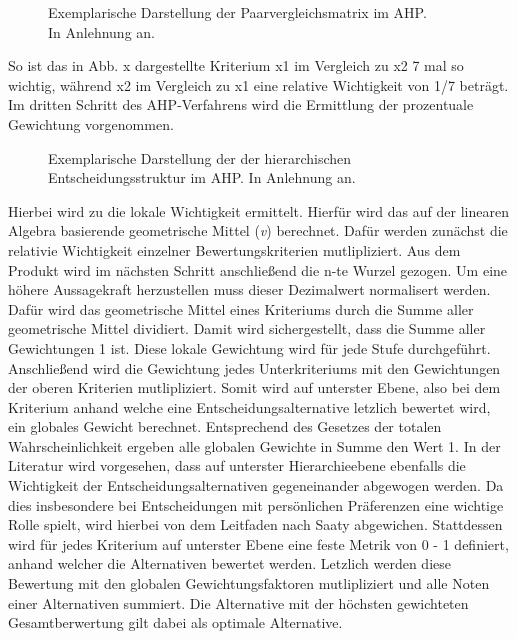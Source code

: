 \begin{center}
	\begin{figure}[H]
		\centering
		\caption[Exemplarische Darstellung der Paarvergleichsmatrix im AHP]{Exemplarische Darstellung der Paarvergleichsmatrix im AHP.\\ In Anlehnung an.}
		\label{fig:AHP_B}
	\end{figure}
\end{center}
\vspace*{-10mm}
So ist das in Abb. x dargestellte Kriterium x1 im Vergleich zu x2 7 mal so wichtig, während x2 im Vergleich zu x1 eine relative Wichtigkeit von 1/7 beträgt. Im dritten Schritt des AHP-Verfahrens wird die Ermittlung der prozentuale Gewichtung vorgenommen.
\begin{center}
	\begin{figure}[H]
		\centering
		\caption[Exemplarische Darstellung der der hierarchischen Entscheidungsstruktur im AHP]{Exemplarische Darstellung der der hierarchischen Entscheidungsstruktur im AHP. In Anlehnung an.}
		\label{fig:AHP_B}
	\end{figure}
\end{center}
\vspace*{-10mm}
Hierbei wird zu die lokale Wichtigkeit ermittelt. Hierfür wird das auf der linearen Algebra basierende geometrische Mittel (\textit{v}) berechnet. Dafür werden zunächst die relativie Wichtigkeit einzelner Bewertungskriterien mutlipliziert. Aus dem Produkt wird im nächsten Schritt anschließend die n-te Wurzel gezogen. Um eine höhere Aussagekraft herzustellen muss dieser Dezimalwert normalisert werden. Dafür wird das geometrische Mittel eines Kriteriums durch die Summe aller geometrische Mittel dividiert. Damit wird sichergestellt, dass die Summe aller Gewichtungen 1 ist. Diese lokale Gewichtung wird für jede Stufe durchgeführt. Anschließend wird die Gewichtung jedes Unterkriteriums mit den Gewichtungen der oberen Kriterien mutlipliziert. Somit wird auf unterster Ebene, also bei dem Kriterium anhand welche eine Entscheidungsalternative letzlich bewertet wird, ein globales Gewicht berechnet. Entsprechend des Gesetzes der totalen Wahrscheinlichkeit ergeben alle globalen Gewichte in Summe den Wert 1. In der Literatur wird vorgesehen, dass auf unterster Hierarchieebene ebenfalls die Wichtigkeit der Entscheidungsalternativen gegeneinander abgewogen werden. Da dies insbesondere bei Entscheidungen mit persönlichen Präferenzen eine wichtige Rolle spielt, wird hierbei von dem Leitfaden nach Saaty abgewichen. Stattdessen wird für jedes Kriterium auf unterster Ebene eine feste Metrik von 0 - 1 definiert, anhand welcher die Alternativen bewertet werden. Letzlich werden diese Bewertung mit den globalen Gewichtungsfaktoren mutlipliziert und alle Noten einer Alternativen summiert. Die Alternative mit der höchsten gewichteten Gesamtberwertung gilt dabei als optimale Alternative. 

